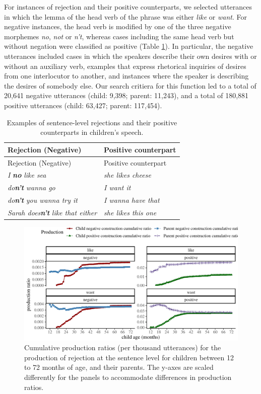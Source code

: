 \documentclass[
  man,floatsintext]{apa6}
\begin{document}
For instances of rejection and their positive counterparts, we selected utterances in which the lemma of the head verb of the phrase was either \emph{like} or \emph{want}. For negative instances, the head verb is modified by one of the three negative morphemes \emph{no}, \emph{not} or \emph{n't}, whereas cases including the same head verb but without negation were classified as positive (Table \ref{tab:rejection}). In particular, the negative utterances included cases in which the speakers describe their own desires with or without an auxiliary verb, examples that express rhetorical inquiries of desires from one interlocutor to another, and instances where the speaker is describing the desires of somebody else. Our search critiera for this function led to a total of 20,641 negative utterances (child: 9,398; parent: 11,243), and a total of 180,881 positive utterances (child: 63,427; parent: 117,454).

\begin{longtable}[]{@{}ll@{}}
\caption{\label{tab:rejection} Examples of sentence-level rejections and their positive counterparts in children's speech.}\tabularnewline
\toprule\noalign{}
Rejection (Negative) & Positive counterpart \\
\midrule\noalign{}
\endfirsthead
\toprule\noalign{}
Rejection (Negative) & Positive counterpart \\
\midrule\noalign{}
\endhead
\bottomrule\noalign{}
\endlastfoot
\emph{I} \textbf{\emph{no}} \emph{like sea} & \emph{she likes cheese} \\
\emph{do\textbf{n't}} \emph{wanna go} & \emph{I want it} \\
\emph{do\textbf{n't}} \emph{you wanna try it} & \emph{I wanna have that} \\
\emph{Sarah does\textbf{n't}} \emph{like that either} & \emph{she likes this one} \\
\end{longtable}

\begin{figure}[H]

{\centering \includegraphics{neg_construction_article_files/figure-latex/emotion-1} 

}

\caption{Cumulative production ratios (per thousand utterances) for the production of rejection at the sentence level for children between 12 to 72 months of age, and their parents. The y-axes are scaled differently for the panels to accommodate differences in production ratios.}\label{fig:emotion}
\end{figure}
\end{document}
